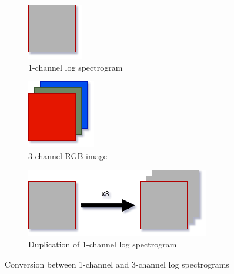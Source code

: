 \documentclass{article}
\theoremstyle{definition}
\theoremstyle{remark}
\begin{document}
\begin{figure}[h!]
\centering
\begin{subfigure}{.34\textwidth}
  \centering
  \includegraphics[width=0.5\linewidth]{img/grayscale.png}
  \caption{1-channel log spectrogram}
  \label{fig:sub1}
\end{subfigure}%
\begin{subfigure}{.34\textwidth}
  \centering
  \includegraphics[width=0.5\linewidth]{img/rgb.png}
  \caption{3-channel RGB image}
  \label{fig:sub2}
\end{subfigure}
\par\bigskip
\begin{subfigure}{.5\textwidth}
  \centering
  \includegraphics[width=1\linewidth]{img/grayscale_multiply.png}
  \caption{Duplication of 1-channel log spectrogram}
  \label{fig:sub2}
\end{subfigure}
\caption{Conversion between 1-channel and 3-channel log spectrograms}
\label{fig:channel_conversion}
\end{figure}
\end{document}
